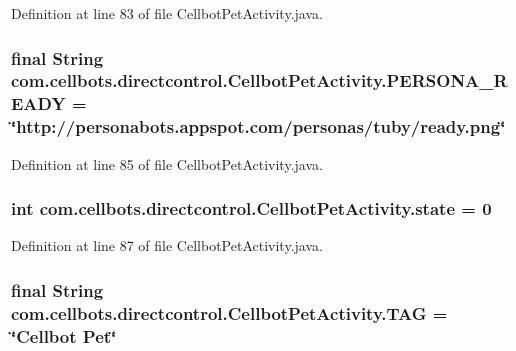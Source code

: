 Definition at line 83 of file Cellbot\-Pet\-Activity.\-java.

\hypertarget{classcom_1_1cellbots_1_1directcontrol_1_1_cellbot_pet_activity_ad88d2d6b9599f7b288a677b958230e3e}{
\subsubsection[{P\-E\-R\-S\-O\-N\-A\-\_\-\-R\-E\-A\-D\-Y}]{\setlength{\rightskip}{0pt plus 5cm}final String {\bf com.\-cellbots.\-directcontrol.\-Cellbot\-Pet\-Activity.\-P\-E\-R\-S\-O\-N\-A\-\_\-\-R\-E\-A\-D\-Y} = \char`\"{}http\-://personabots.\-appspot.\-com/personas/tuby/ready.\-png\char`\"{}}}\label{classcom_1_1cellbots_1_1directcontrol_1_1_cellbot_pet_activity_ad88d2d6b9599f7b288a677b958230e3e}


Definition at line 85 of file Cellbot\-Pet\-Activity.\-java.

\hypertarget{classcom_1_1cellbots_1_1directcontrol_1_1_cellbot_pet_activity_a44cb62aa6ced32575ae892b6a4851680}{
\subsubsection[{state}]{\setlength{\rightskip}{0pt plus 5cm}int {\bf com.\-cellbots.\-directcontrol.\-Cellbot\-Pet\-Activity.\-state} = 0}}\label{classcom_1_1cellbots_1_1directcontrol_1_1_cellbot_pet_activity_a44cb62aa6ced32575ae892b6a4851680}


Definition at line 87 of file Cellbot\-Pet\-Activity.\-java.

\hypertarget{classcom_1_1cellbots_1_1directcontrol_1_1_cellbot_pet_activity_a9a154d9f141a9bd2ca204303c22a9dd0}{
\subsubsection[{T\-A\-G}]{\setlength{\rightskip}{0pt plus 5cm}final String {\bf com.\-cellbots.\-directcontrol.\-Cellbot\-Pet\-Activity.\-T\-A\-G} = \char`\"{}Cellbot Pet\char`\"{}}}\label{classcom_1_1cellbots_1_1directcontrol_1_1_cellbot_pet_activity_a9a154d9f141a9bd2ca204303c22a9dd0}


